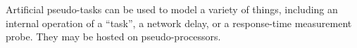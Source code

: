 \documentclass[11pt]{article}
\begin{document}
Artificial pseudo-tasks can be used to model a variety of things, including an internal
operation of a ``task'', a network delay, or a response-time measurement probe. They may be hosted
on pseudo-processors.

\begin{figure}
  \centering
  \quad
  \quad

\end{figure}
\end{document}
